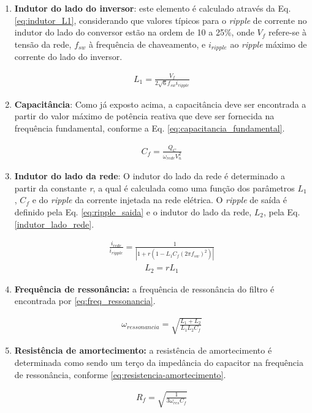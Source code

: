 \begin{enumerate}
	\item \textbf{Indutor do lado do inversor}: este elemento é calculado através da Eq. \ref{eq:indutor_L1}, considerando que valores típicos para o \textit{ripple} de corrente no indutor do lado do conversor estão na ordem de 10 a 25\%, onde $V_f$ refere-se à tensão da rede, $f_{sw}$ à frequência de chaveamento, e $i_{ripple}$ ao \textit{ripple} máximo de corrente do lado do inversor.

	\begin{align}\label{eq:indutor_L1}
		L_1 = \frac{V_f}{2\sqrt{6}f_{sw}i_{ripple}}
	\end{align}
	
	\item \textbf{Capacitância}: Como já exposto acima, a capacitância deve ser encontrada a partir do valor máximo de potência reativa que deve ser fornecida na frequência fundamental, conforme a Eq. \ref{eq:capacitancia_fundamental}.
	
	\begin{align}\label{eq:capacitancia_fundamental}
		C_f = \frac{Q_C}{\omega_{rede}V^2_n}
	\end{align}
	
	\item \textbf{Indutor do lado da rede}: O indutor do lado da rede é determinado a partir da constante \textit{r}, a qual é calculada como uma função dos parâmetros $L_1$, $C_f$ e do \textit{ripple} da corrente injetada na rede elétrica. O \textit{ripple} de saída é definido pela Eq. \ref{eq:ripple_saida} e o indutor do lado da rede, $L_2$, pela Eq. \ref{indutor_lado_rede}.
	
	\begin{align}\label{eq:ripple_saida}
		\frac{i_{rede}}{i_{ripple}} = \frac{1}{|1 + r(1 - L_1C_f(2\pi f_{sw})^2)|}
	\end{align}
	\begin{align}\label{indutor_lado_rede}
		L_2 = rL_1
	\end{align}
	
	\item \textbf{Frequência de ressonância:} a frequência de ressonância do filtro é encontrada por \ref{eq:freq_ressonancia}.
	
	\begin{align}\label{eq:freq_ressonancia}
		\omega_{ressonancia} = \sqrt{\frac{L_1 + L_2}{L_1L_2C_f}}
	\end{align}
	
	\item \textbf{Resistência de amortecimento:} a resistência de amortecimento é determinada como sendo um terço da impedância do capacitor na frequência de ressonância, conforme \ref{eq:resistencia-amortecimento}.
	
	\begin{align}\label{eq:resistencia-amortecimento}
		R_f = \sqrt{\frac{1}{3\omega_{res}C_f}}
	\end{align}
	
\end{enumerate}

